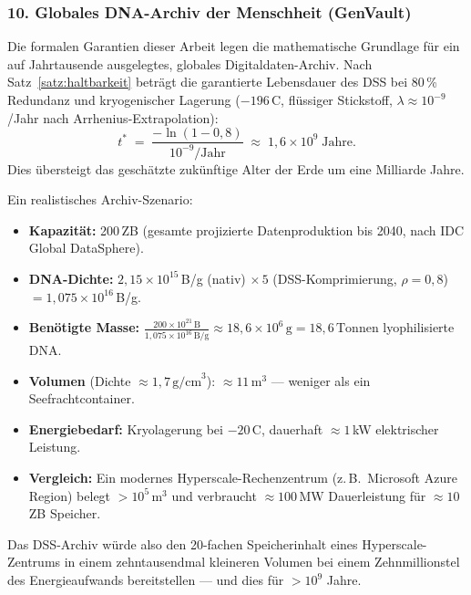 ﻿\documentclass[a4paper,12pt]{article}
\theoremstyle{definition}
\begin{document}
\subsubsection*{10.\; Globales DNA-Archiv der Menschheit (GenVault)}

Die formalen Garantien dieser Arbeit legen die mathematische Grundlage
f\"{u}r ein auf Jahrtausende ausgelegtes, globales Digitaldaten-Archiv.
Nach Satz~\ref{satz:haltbarkeit} betr\"{a}gt die garantierte Lebensdauer
des DSS bei 80\,\% Redundanz und kryogenischer Lagerung
($-196$\,\textdegree{}C, fl\"{u}ssiger Stickstoff,
$\lambda \approx 10^{-9}$/Jahr nach Arrhenius-Extrapolation):
\[
    t^* \;=\; \frac{-\ln(1-0{,}8)}{10^{-9}/\mathrm{Jahr}}
    \;\approx\; 1{,}6 \times 10^9 \;\text{Jahre}.
\]
Dies \"{u}bersteigt das gesch\"{a}tzte zuk\"{u}nftige Alter der Erde um
eine Milliarde Jahre.

Ein realistisches Archiv-Szenario:
\begin{itemize}
    \item \textbf{Kapazit\"{a}t:} 200\,ZB (gesamte projizierte Daten\-produktion bis 2040,
          nach IDC Global DataSphere).
    \item \textbf{DNA-Dichte:} $2{,}15 \times 10^{15}$\,B/g (nativ)
          $\times\,5$ (DSS-Komprimierung, $\rho=0{,}8$)
          $= 1{,}075 \times 10^{16}$\,B/g.
    \item \textbf{Ben\"{o}tigte Masse:}
          $\frac{200 \times 10^{21}\,\text{B}}{1{,}075 \times 10^{16}\,\text{B/g}}
          \approx 18{,}6 \times 10^6\,\text{g} = 18{,}6\,\text{Tonnen}$
          lyophilisierte DNA.
    \item \textbf{Volumen} (Dichte $\approx 1{,}7\,\text{g/cm}^3$):
          $\approx 11\,\text{m}^3$ --- weniger als ein Seefrachtcontainer.
    \item \textbf{Energiebedarf:} Kryolagerung bei $-20$\,\textdegree{}C,
          dauerhaft $\approx 1$\,kW elektrischer Leistung.
    \item \textbf{Vergleich:} Ein modernes Hyperscale-Rechenzentrum
          (z.\,B.\ Microsoft Azure Region) belegt $> 10^5\,\text{m}^3$
          und verbraucht $\approx 100$\,MW Dauerleistung f\"{u}r
          $\approx 10$\,ZB Speicher.
\end{itemize}

Das DSS-Archiv w\"{u}rde also den 20-fachen Speicherinhalt eines Hyperscale-Zentrums
in einem zehntausendmal kleineren Volumen bei einem Zehnmillionstel des
Energieaufwands bereitstellen --- und dies f\"{u}r $> 10^9$ Jahre.
\end{document}
